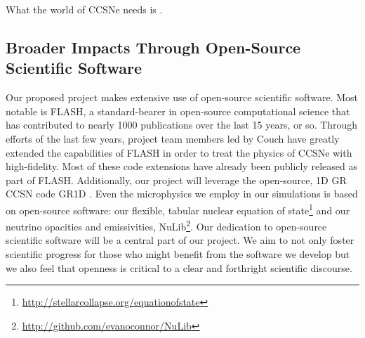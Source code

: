 What the world of CCSNe needs is .


\subsection{Broader Impacts Through Open-Source Scientific Software}

Our proposed project makes extensive use of open-source scientific software.
Most notable is FLASH, a standard-bearer in open-source computational science that has contributed to nearly 1000 publications over the last 15 years, or so.
Through efforts of the last few years, project team members led by Couch have greatly extended the capabilities of FLASH in order to treat the physics of CCSNe with high-fidelity.
Most of these code extensions have already been publicly released as part of FLASH.
Additionally, our project will leverage the open-source, 1D GR CCSN code GR1D \citep{OConnor:2010, OConnor:2013, OConnor:2015}.
Even the microphysics we employ in our simulations is based on open-source software: our flexible, tabular nuclear equation of state\footnote{\url{http://stellarcollapse.org/equationofstate}} and our neutrino opacities and emissivities, NuLib\footnote{\url{http://github.com/evanoconnor/NuLib}}.
Our dedication to open-source scientific software will be a central part of our project.
We aim to not only foster scientific progress for those who might benefit from the software we develop but we also feel that openness is critical to a clear and forthright scientific discourse.




